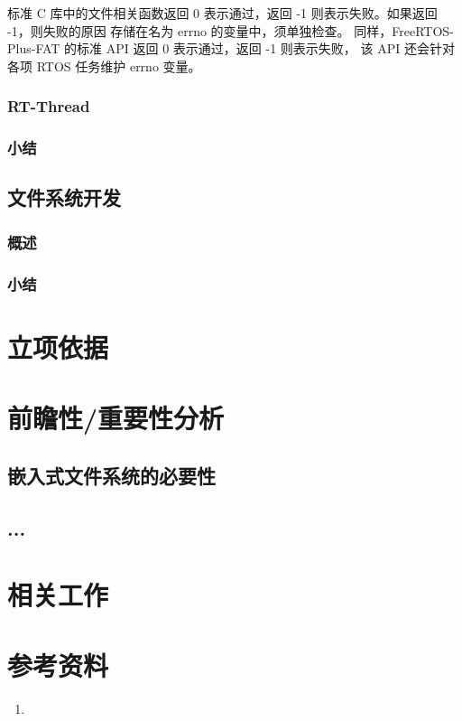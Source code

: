 \documentclass[a4paper]{article}
\begin{document}
标准 C 库中的文件相关函数返回 0 表示通过，返回 -1 则表示失败。如果返回 -1，则失败的原因 存储在名为 errno 的变量中，须单独检查。 同样，FreeRTOS-Plus-FAT 的标准 API 返回 0 表示通过，返回 -1 则表示失败， 该 API 还会针对各项 RTOS 任务维护 errno 变量。
\subsubsection{RT-Thread}
\subsubsection{小结}

\subsection{文件系统开发}
\subsubsection{概述}
\subsubsection{小结}

\newpage
\section{立项依据}



\section{前瞻性/重要性分析}
\subsection{嵌入式文件系统的必要性}
\subsection{...}
\section{相关工作}


\section{参考资料}
\begin{enumerate}
    \item 
    
\end{enumerate}
\end{document}
